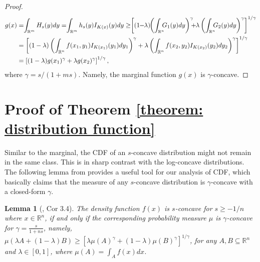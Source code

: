 \documentclass[11pt]{article}
\newtheorem{lemma}[theorem]{Lemma}
\begin{document}
{\begin{proof}
\begin{equation*}
\begin{split}
g(x)&=\hspace{-0.1cm}\int_{\mathbb{R}^m}H_s(y)dy=\hspace{-0.1cm}\int_{\mathbb{R}^m}h_s(y)I_{K(x)}(y)dy\ge \hspace{-0.1cm}\left[(1\hspace{-0.1cm}-\hspace{-0.1cm}\lambda)\hspace{-0.1cm}\left(\int_{\mathbb{R}^n}\hspace{-0.2cm}G_1(y)dy\right)^\gamma\hspace{-0.2cm}+\hspace{-0.1cm}\lambda\left(\int_{\mathbb{R}^n}\hspace{-0.2cm}G_2(y)dy\right)^\gamma\right]^{1/\gamma}\\
&=\left[(1-\lambda)\left(\int_{\mathbb{R}^n}f(x_1,y_1)I_{K(x_1)}(y_1)dy_1\right)^\gamma+\lambda\left(\int_{\mathbb{R}^n}f(x_2,y_2)I_{K(x_2)}(y_2)dy_2\right)^\gamma\right]^{1/\gamma}\\
&=\left[(1-\lambda)g(x_1)^\gamma+\lambda g(x_2)^\gamma\right]^{1/\gamma},
\end{split}
\end{equation*}
where $\gamma=s/(1+ms)$. Namely, the marginal function $g(x)$ is $\gamma$-concave.
\end{proof}


\section{Proof of Theorem \ref{theorem: distribution function}}
Similar to the marginal, the CDF of an $s$-concave distribution might not remain in the same class. This is in sharp contrast with the log-concave distributions. The following lemma from \cite{brascamp2002extensions} provides a useful tool for our analysis of CDF, which basically claims that the measure of any $s$-concave distribution is $\gamma$-concave with a closed-form $\gamma$.

\begin{lemma}[\cite{brascamp2002extensions}, Cor 3.4]
\label{lemma: generalized brunn-minkowski inequality}
The density function $f(x)$ is $s$-concave for $s\ge -1/n$ where $x\in\mathbb{R}^n$, if and only if the corresponding probability measure $\mu$ is $\gamma$-concave for $\gamma=\frac{s}{1+ns}$, namely,
$\mu(\lambda A+(1-\lambda)B)\ge \left[\lambda\mu(A)^\gamma+(1-\lambda)\mu(B)^\gamma\right]^{1/\gamma}$,
for any $A,B\subseteq \mathbb{R}^n$ and $\lambda\in[0,1]$, where $\mu(A)=\int_A f(x)dx$.
\end{lemma}


}
\end{document}
